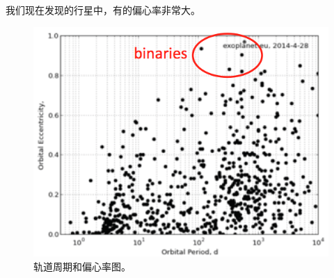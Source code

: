 \documentclass[letterpaper,10pt,english]{sphinxmanual}
\begin{document}
我们现在发现的行星中，有的偏心率非常大。
\begin{figure}[htbp]
\centering
\capstart

\includegraphics{eVSp.png}
\caption{轨道周期和偏心率图。}\end{figure}
\end{document}
